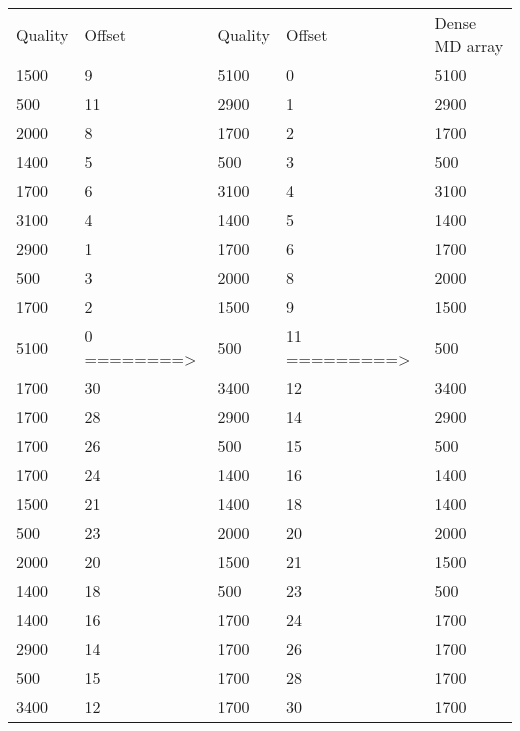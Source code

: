 \documentclass[a4paper,12pt]{article}
\begin{document}
\begin{Large}
\begin{center}
\begin{tabular}{lllll}
Quality & Offset &   Quality & Offset &Dense MD array\\
  1500   &  9   &  5100   &  0   &  5100 \\
  500   &  11    & 2900   &  1  &   2900\\
  2000   &  8   &  1700   &  2     &1700\\
  1400   &  5   &  500   &  3     &500\\
  1700   &  6   &  3100   &  4    & 3100\\
  3100   &  4    & 1400   &  5    & 1400\\
  2900   &  1   &  1700   &  6    &   1700\\
  500   &  3     &  2000   &  8   &  2000\\
  1700   &  2    & 1500   &  9    & 1500\\
  5100   &  0   ========> &  500   &  11  =========> &   500\\ 
  1700   &  30    &  3400   &  12 &   3400\\ 
  1700   &  28    &  2900   &  14 &    2900\\
  1700   &  26    &  500   &  15   & 500\\
  1700   &  24    &  1400    &  16  &  1400 \\
  1500   &  21     &  1400   &  18  &     1400\\
  500   &  23      &  2000   &  20  &    2000\\
  2000   &  20    &  1500   &  21   &     1500\\
  1400   &  18    &  500   &  23    &  500\\
  1400    &  16     &  1700   &  24 &   1700\\
  2900   &  14     &  1700   &  26  &    1700\\
  500   &  15      &  1700   &  28    &  1700\\
  3400   &  12    &  1700   &  30 &   1700\\

\end{tabular}
\end{center}
\end{Large}
\end{document}
